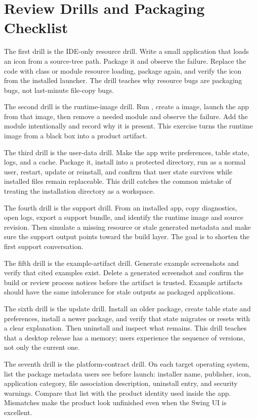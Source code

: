\section{Review Drills and Packaging Checklist}

The first drill is the IDE-only resource drill. Write a small application that loads an icon from a source-tree path. Package it and observe the failure. Replace the code with class or module resource loading, package again, and verify the icon from the installed launcher. The drill teaches why resource bugs are packaging bugs, not last-minute file-copy bugs.

The second drill is the runtime-image drill. Run , create a  image, launch the app from that image, then remove a needed module and observe the failure. Add the module intentionally and record why it is present. This exercise turns the runtime image from a black box into a product artifact.

The third drill is the user-data drill. Make the app write preferences, table state, logs, and a cache. Package it, install into a protected directory, run as a normal user, restart, update or reinstall, and confirm that user state survives while installed files remain replaceable. This drill catches the common mistake of treating the installation directory as a workspace.

The fourth drill is the support drill. From an installed app, copy diagnostics, open logs, export a support bundle, and identify the runtime image and source revision. Then simulate a missing resource or stale generated metadata and make sure the support output points toward the build layer. The goal is to shorten the first support conversation.

The fifth drill is the example-artifact drill. Generate example screenshots and verify that cited examples exist. Delete a generated screenshot and confirm the build or review process notices before the artifact is trusted. Example artifacts should have the same intolerance for stale outputs as packaged applications.

The sixth drill is the update drill. Install an older package, create table state and preferences, install a newer package, and verify that state migrates or resets with a clear explanation. Then uninstall and inspect what remains. This drill teaches that a desktop release has a memory; users experience the sequence of versions, not only the current one.

The seventh drill is the platform-contract drill. On each target operating system, list the package metadata users see before launch: installer name, publisher, icon, application category, file association description, uninstall entry, and security warnings. Compare that list with the product identity used inside the app. Mismatches make the product look unfinished even when the Swing UI is excellent.

